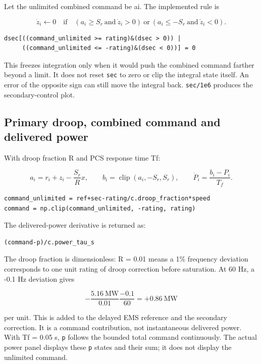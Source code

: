 \documentclass[11pt,a4paper]{article}
\begin{document}
Let the unlimited combined command be ai. The implemented rule is

\[
\dot z_i\leftarrow0\quad\text{if}\quad
(a_i\ge S_r\ \text{and}\ \dot z_i>0)\ \text{or}\
(a_i\le-S_r\ \text{and}\ \dot z_i<0).
\]

\begin{lstlisting}
dsec[((command_unlimited >= rating)&(dsec > 0)) |
     ((command_unlimited <= -rating)&(dsec < 0))] = 0
\end{lstlisting}

This freezes integration only when it would push the combined command farther beyond a limit. It does not reset \texttt{sec} to zero or clip the integral state itself. An error of the opposite sign can still move the integral back. \texttt{sec/1e6} produces the secondary-control plot.

\subsection{Primary droop, combined command and delivered power}

With droop fraction R and PCS response time Tf:

\[
a_i=r_i+z_i-\frac{S_r}{R}x,\qquad
b_i=\operatorname{clip}(a_i,-S_r,S_r),\qquad
\dot P_i=\frac{b_i-P_i}{T_f}.
\]

\begin{lstlisting}
command_unlimited = ref+sec-rating/c.droop_fraction*speed
command = np.clip(command_unlimited, -rating, rating)
\end{lstlisting}

The delivered-power derivative is returned as:

\begin{lstlisting}
(command-p)/c.power_tau_s
\end{lstlisting}

The droop fraction is dimensionless: R = 0.01 means a 1\% frequency deviation corresponds to one unit rating of droop correction before saturation. At 60 Hz, a -0.1 Hz deviation gives

\[
-\frac{5.16\ \mathrm{MW}}{0.01}\frac{-0.1}{60}=+0.86\ \mathrm{MW}
\]

per unit. This is added to the delayed EMS reference and the secondary correction. It is a command contribution, not instantaneous delivered power. With Tf = 0.05 s, \texttt{p} follows the bounded total command continuously. The actual power panel displays these \texttt{p} states and their sum; it does not display the unlimited command.
\end{document}
